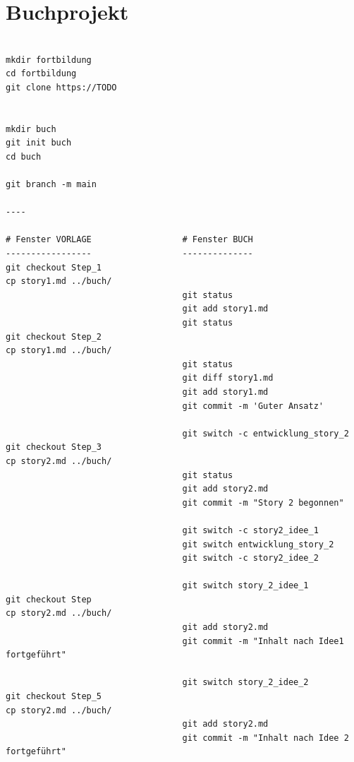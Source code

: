 \documentclass[]{scrreprt}
\begin{document}
\section*{Buchprojekt}
\begin{lstlisting}

mkdir fortbildung
cd fortbildung
git clone https://TODO


mkdir buch
git init buch
cd buch

git branch -m main

----

# Fenster VORLAGE                  # Fenster BUCH
-----------------                  --------------  
git checkout Step_1
cp story1.md ../buch/                      
                                   git status
                                   git add story1.md
                                   git status
git checkout Step_2
cp story1.md ../buch/                      
                                   git status
                                   git diff story1.md
                                   git add story1.md
                                   git commit -m 'Guter Ansatz'                                              

                                   git switch -c entwicklung_story_2
git checkout Step_3
cp story2.md ../buch/
                                   git status
                                   git add story2.md
                                   git commit -m "Story 2 begonnen"
                                   
                                   git switch -c story2_idee_1
                                   git switch entwicklung_story_2
                                   git switch -c story2_idee_2
                                   
                                   git switch story_2_idee_1
git checkout Step               
cp story2.md ../buch/
                                   git add story2.md
                                   git commit -m "Inhalt nach Idee1 fortgeführt"
                                   
                                   git switch story_2_idee_2
git checkout Step_5                                
cp story2.md ../buch/
                                   git add story2.md
                                   git commit -m "Inhalt nach Idee 2 fortgeführt"

\end{lstlisting}
\end{document}
